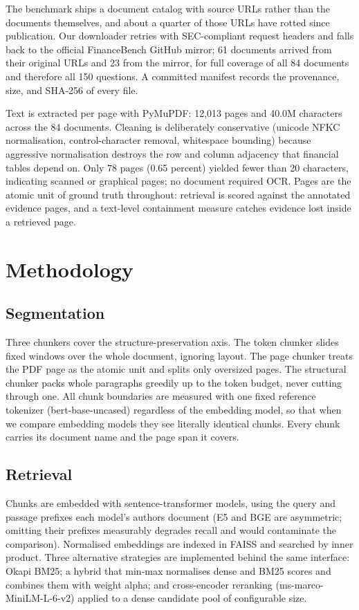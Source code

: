 \documentclass[
  11pt,
]{article}
\begin{document}
The benchmark ships a document catalog with source URLs rather than the
documents themselves, and about a quarter of those URLs have rotted
since publication. Our downloader retries with SEC-compliant request
headers and falls back to the official FinanceBench GitHub mirror; 61
documents arrived from their original URLs and 23 from the mirror, for
full coverage of all 84 documents and therefore all 150 questions. A
committed manifest records the provenance, size, and SHA-256 of every
file.

Text is extracted per page with PyMuPDF: 12,013 pages and 40.0M
characters across the 84 documents. Cleaning is deliberately
conservative (unicode NFKC normalisation, control-character removal,
whitespace bounding) because aggressive normalisation destroys the row
and column adjacency that financial tables depend on. Only 78 pages
(0.65 percent) yielded fewer than 20 characters, indicating scanned or
graphical pages; no document required OCR. Pages are the atomic unit of
ground truth throughout: retrieval is scored against the annotated
evidence pages, and a text-level containment measure catches evidence
lost inside a retrieved page.

\section{Methodology}\label{methodology}

\subsection{Segmentation}\label{segmentation}

Three chunkers cover the structure-preservation axis. The token chunker
slides fixed windows over the whole document, ignoring layout. The page
chunker treats the PDF page as the atomic unit and splits only oversized
pages. The structural chunker packs whole paragraphs greedily up to the
token budget, never cutting through one. All chunk boundaries are
measured with one fixed reference tokenizer (bert-base-uncased)
regardless of the embedding model, so that when we compare embedding
models they see literally identical chunks. Every chunk carries its
document name and the page span it covers.

\subsection{Retrieval}\label{retrieval}

Chunks are embedded with sentence-transformer models, using the query
and passage prefixes each model's authors document (E5 and BGE are
asymmetric; omitting their prefixes measurably degrades recall and would
contaminate the comparison). Normalised embeddings are indexed in FAISS
and searched by inner product. Three alternative strategies are
implemented behind the same interface: Okapi BM25; a hybrid that min-max
normalises dense and BM25 scores and combines them with weight alpha;
and cross-encoder reranking (ms-marco-MiniLM-L-6-v2) applied to a dense
candidate pool of configurable size.
\end{document}
